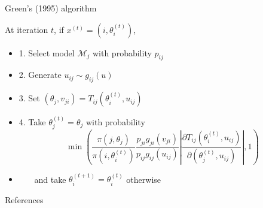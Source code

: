 \documentclass[mathserif, 12pt, t]{beamer}
\newcommand{\citei}[1]{\phantom{\cite{#1}}\vspace{-14pt}}
\renewcommand{\frametitle}[1]{\vspace{0.14cm}\hspace{-0.70cm}\textcolor{col2}{%
    \Large{#1}}\vspace{0.15cm}\newline}
\begin{document}
\begin{frame}
\frametitle{Green's (1995) algorithm}

At iteration $t$, if $x^{(t)}=(i,\theta_i^{(t)})$,
\begin{itemize}
\item 1. Select model $\mathcal{M}_j$ with probability $p_{ij}$
\item 2. Generate $u_{ij}\sim g_{ij}(u)$
\item 3. Set $(\theta_j, v_{ji})=T_{ij}(\theta_i^{(t)},u_{ij})$
\item 4. Take $\theta_j^{(t)}=\theta_j$ with probability
\[ \min\left(\frac{\pi(j,\theta_j)}{\pi(i,\theta_i^{(t)})}\frac{p_{ji}g_{ji}(v_{ji})}{p_{ij}g_{ij}(u_{ij})}\left|\frac{\partial T_{ij}(\theta_i^{(t)},u_{ij})}{\partial(\theta_j^{(t)},u_{ij})}\right|,1\right) \]
\item ~~~ and take $\theta_i^{(t+1)}=\theta_i^{(t)}$ otherwise
\end{itemize}

\end{frame}

%
%
%
%

\begin{frame}
\frametitle{References}

\citei{green1995reversible}
\citei{richardson1997bayesian}
\citei{robert2013monte}




\end{frame}
\end{document}
